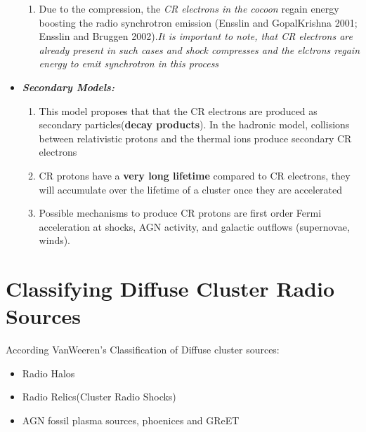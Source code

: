 \documentclass[12pt]{report}
\newcommand{\tbf}[1]{\textbf{#1}}
\newcommand{\tit}[1]{\textit{#1}}
\begin{document}
\begin{itemize}
\begin{enumerate}
 \item Due to the compression, the \tit{CR electrons in the cocoon} regain energy boosting the radio synchrotron emission (Ensslin and GopalKrishna 2001; Ensslin and Bruggen 2002).\tit{It is important to note, that CR electrons are already present in such cases and shock compresses and the elctrons regain energy to emit synchrotron in this process}
 \end{enumerate}
\item \tit{\tbf{Secondary Models:}}
\begin{enumerate}
\item This model proposes that that the CR electrons are produced as secondary particles(\tbf{decay products}). In the hadronic model, collisions between relativistic protons and the thermal ions produce secondary CR electrons
\item  CR protons have a \tbf{very long lifetime} compared to CR electrons, they will accumulate over the lifetime of a cluster once they are accelerated
\item Possible mechanisms to produce CR protons are first order Fermi acceleration at shocks, AGN activity, and galactic outflows (supernovae, winds).
\end{enumerate}
 \end{itemize}
 \section{Classifying Diffuse Cluster Radio Sources}
According VanWeeren's Classification of Diffuse cluster sources:
\begin{itemize}
\item Radio Halos
\item Radio Relics(Cluster Radio Shocks)
\item AGN fossil plasma sources, phoenices and GReET
\end{itemize}
\end{document}

